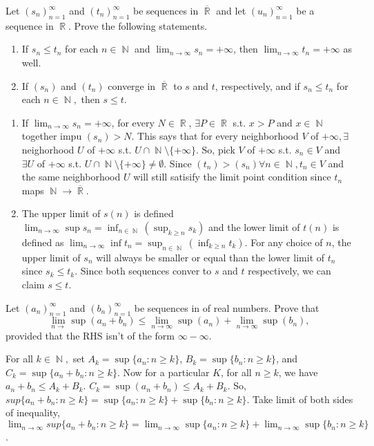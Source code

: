 \documentclass[12pt,letterpaper,boxed]{hmcpset}
\DeclareMathOperator{\N}{\mathbb{N}}
\DeclareMathOperator{\R}{\mathbb{R}}
\begin{document}
\begin{problem}[Exercise 4.2]
Let $(s_n)_{n=1}^{\infty}$ and $(t_n)_{n=1}^{\infty}$ be sequences in $\overline{\R}$ and let $(u_n)_{n=1}^{\infty}$ be a sequence in $\R$. Prove the following statements.
\vspace{-2mm}
    \begin{enumerate}
        \itemsep0em
        \item If $s_n \leq t_n$ for each $n\in\N$ and $\lim_{n\rightarrow \infty} s_n = + \infty$, then $\lim_{n\rightarrow \infty} t_n = + \infty$ as well.
        \item If $(s_n)$ and $(t_n)$ converge in $\overline{\R}$ to $s$ and $t$, respectively, and if $s_n \leq t_n$ for each $n\in\N,$ then $s \leq t.$
    \end{enumerate}
\end{problem}

\begin{solution}
\begin{enumerate}
        \itemsep0em
        \item If $\lim_{n\rightarrow\infty} s_n = +\infty$, for every $N \in \R$, $\exists P \in \R$ s.t. $x>P$ and $x\in\N$ together impu $(s_n) > N.$ This says that for every neighborhood $V$ of $+\infty, \exists$ neighorhood $U$ of $+\infty$ s.t. $U\cap\N\setminus \{+\infty\}$. So, pick $V$ of $+\infty$ s.t. $s_n\in V$ and $\exists U$ of $+\infty$ s.t. $U\cap\N\setminus \{+\infty\}\neq\emptyset$. Since $(t_n) > (s_n) \forall n\in\N, t_n \in V$ and the same neighborhood $U$ will still satisify the limit point condition since $t_n$ maps $\N\rightarrow\overline{\R}.$
        \item The upper limit of $s(n)$ is defined $\lim_{n\rightarrow\infty}\sup s_n = \inf_{n \in \N}(\sup_{k \ge n} s_k)$ and the lower limit of $t(n)$ is defined as $\lim_{n\rightarrow\infty}\inf t_n = \sup_{n \in \N}(\inf_{k \ge n} t_k)$. For any choice of $n$, the upper limit of $s_n$ will always be smaller or equal than the lower limit of $t_n$ since $s_k \leq t_k.$ Since both sequences conver to $s$ and $t$ respectively, we can claim $s \leq t.$
    \end{enumerate}
\end{solution}
\newpage 
\begin{problem}[Exercise 4.5]
Let $(a_n)_{n=1}^{\infty}$ and $(b_n)_{n=1}^{\infty}$ be sequences in of real numbers. Prove that $$\lim_{n \rightarrow} \sup(a_n + b_n) \leq \lim_{n \rightarrow \infty} \sup(a_n) + \lim_{n \rightarrow \infty} \sup(b_n),$$ provided that the RHS isn't of the form $\infty - \infty$.
\end{problem}

\begin{solution}
For all $k\in\N,$ set $A_k=\sup\{a_n : n \ge k\}$, $B_k=\sup\{b_n : n \ge k\}$, and $C_k = \sup\{ a_n + b_n : n \ge k\}$. Now for a particular $K$, for all $n \ge k$, we have $a_n + b_n \leq A_k + B_k.$ $C_k = \sup{(a_n + b_n)} \leq A_k + B_k$. So, $sup\{ a_n + b_n : n \ge k\} = \sup\{a_n : n \ge k\} + \sup\{b_n : n \ge k\}$. Take limit of both sides of inequality, $\lim_{n\rightarrow\infty}sup\{ a_n + b_n : n \ge k\} = \lim_{n\rightarrow\infty}\sup\{a_n : n \ge k\} + \lim_{n\rightarrow\infty}\sup\{b_n : n \ge k\}$.
\end{solution}
\end{document}

